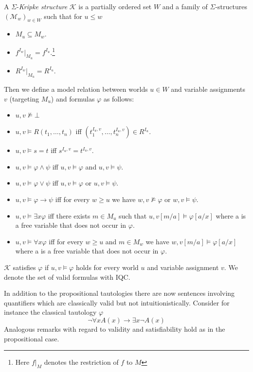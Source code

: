 \documentclass[a4paper,UKenglish,cleveref, autoref, thm-restate]{lipics-v2021}
\begin{document}
\begin{definition}
	A $\Sigma$-\emph{Kripke structure} $\mathcal{K}$ is a partially ordered set $W$ and a family of $\Sigma$-structures $(\mathcal{M}_w)_{w\in W}$ such that for $u\leq w$
	\begin{itemize}
		\item $M_u\subseteq M_w$.
		\item $f^{I_w}|_{M_u} = f^{I_u}$.\footnote{Here $f|_M$ denotes the restriction of $f$ to $M$}
		\item $R^{I_w}|_{M_u} = R^{I_u}$.
	\end{itemize}
	Then we define a model relation between worlds $u\in W$ and variable assignments $v$ (targeting $M_u$) and formulas $\varphi$ as follows:
	\begin{itemize}
		\item $u, v\not\models\bot$
		\item $u, v\models R(t_1,\dots,t_n)$ iff $(t_1^{I_u, v},\dots,t_n^{I_u, v})\in R^{I_u}$.
		\item $u, v\models s = t$ iff $s^{I_u, v} = t^{I_u, v}$.
		\item $u, v\models \varphi\wedge \psi$ iff $u, v\models\varphi$ and $u, v\models\psi$.
		\item $u, v\models \varphi\vee\psi$ iff $u, v\models\varphi$ or $u, v\models\psi$.
		\item $u, v\models \varphi\to\psi$ iff for every $w\geq u$ we have $w, v\not\models\varphi$ or $w, v\models\psi$.
		\item $u, v\models\exists x\varphi$ iff there exists $m\in M_u$ such that $u, v[m/a]\models\varphi[a/x]$ where a is a free variable that does not occur in $\varphi$.
		\item $u, v\models\forall x\varphi$ iff for every $w\geq u$ and $m\in M_w$ we have $w, v[m/a]\models\varphi[a/x]$ where a is a free variable that does not occur in $\varphi$.
	\end{itemize}
	$\mathcal{K}$ satisfies $\varphi$ if $u, v\models\varphi$ holds for every world $u$ and variable assignment $v$. We denote the set of valid formulas with IQC.
\end{definition}
In addition to the propositional tautologies there are now sentences involving quantifiers which are classically valid but not intuitionistically.
Consider for instance the classical tautology $\varphi$ $$\neg\forall x A(x)\to \exists x \neg A(x)$$Analogous remarks with regard to validity and satisfiability hold as in the propositional case.
\end{document}
